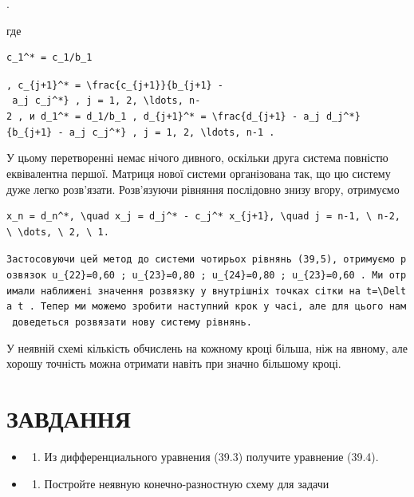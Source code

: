 \documentclass[
  ukrainian,
]{article}
\providecommand{\tightlist}{%
  \setlength{\itemsep}{0pt}\setlength{\parskip}{0pt}}
\begin{document}
.

где

\begin{verbatim}
c_1^* = c_1/b_1
\end{verbatim}

\texttt{,\ \textquotesingle{}c\_\{j+1\}\^{}*\ =\ \textbackslash{}frac\{c\_\{j+1\}\}\{b\_\{j+1\}\ -\ a\_j\ c\_j\^{}*\}\textquotesingle{}\ ,\ \textquotesingle{}j\ =\ 1,\ 2,\ \textbackslash{}ldots,\ n-2\textquotesingle{}\ ,\ и\ \textquotesingle{}d\_1\^{}*\ =\ d\_1/b\_1\textquotesingle{}\ ,\ \textquotesingle{}d\_\{j+1\}\^{}*\ =\ \textbackslash{}frac\{d\_\{j+1\}\ -\ a\_j\ d\_j\^{}*\}\{b\_\{j+1\}\ -\ a\_j\ c\_j\^{}*\}\textquotesingle{}\ ,\ \textquotesingle{}j\ =\ 1,\ 2,\ \textbackslash{}ldots,\ n-1\textquotesingle{}\ .}

У цьому перетворенні немає нічого дивного, оскільки друга система
повністю еквівалентна першої. Матриця нової системи організована так, що
цю систему дуже легко розв'язати. Розв'язуючи рівняння послідовно знизу
вгору, отримуємо

\begin{verbatim}
x_n = d_n^*, \quad x_j = d_j^* - c_j^* x_{j+1}, \quad j = n-1, \ n-2, \ \dots, \ 2, \ 1.
\end{verbatim}

\texttt{Застосовуючи\ цей\ метод\ до\ системи\ чотирьох\ рівнянь\ (39,5),\ отримуємо\ розв\textquotesingle{}язок\ \textquotesingle{}u\_\{22\}=0,60\textquotesingle{}\ ;\ \textquotesingle{}u\_\{23\}=0,80\textquotesingle{}\ ;\ \textquotesingle{}u\_\{24\}=0,80\textquotesingle{}\ ;\ \textquotesingle{}u\_\{23\}=0,60\textquotesingle{}\ .\ Ми\ отримали\ наближені\ значення\ розв\textquotesingle{}язку\ у\ внутрішніх\ точках\ сітки\ на\ \textquotesingle{}t=\textbackslash{}Delta\ t\textquotesingle{}\ .\ Тепер\ ми\ можемо\ зробити\ наступний\ крок\ у\ часі,\ але\ для\ цього\ нам\ доведеться\ розв\textquotesingle{}язати\ нову\ систему\ рівнянь.}

У неявній схемі кількість обчислень на кожному кроці більша, ніж на
явному, але хорошу точність можна отримати навіть при значно більшому
кроці.

\section{ЗАВДАННЯ}\label{ux437ux430ux432ux434ux430ux43dux43dux44f-5}

\begin{itemize}
\tightlist
\item
  \begin{enumerate}
  \def\labelenumi{\arabic{enumi}.}
  \tightlist
  \item
    Из дифференциального уравнения (39.3) получите уравнение (39.4).
  \end{enumerate}
\item
  \begin{enumerate}
  \def\labelenumi{\arabic{enumi}.}
  \setcounter{enumi}{1}
  \tightlist
  \item
    Постройте неявную конечно-разностную схему для задачи
  \end{enumerate}
\end{itemize}
\end{document}
